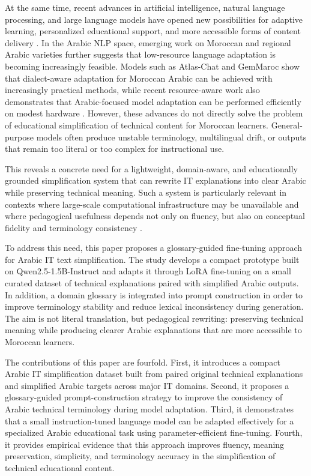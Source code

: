 \documentclass[education,article,submit,moreauthors]{Definitions/mdpi}
\begin{document}
At the same time, recent advances in artificial intelligence, natural language processing, and large language models have opened new possibilities for adaptive learning, personalized educational support, and more accessible forms of content delivery \citep{Alqahtani2023EmergentRoleAI,Gutierrez2023AILanguageEducation,RE2024RevolutionizingEducationAI,Ismaili2024AILiteracyAdaptiveLearning}. In the Arabic NLP space, emerging work on Moroccan and regional Arabic varieties further suggests that low-resource language adaptation is becoming increasingly feasible. Models such as Atlas-Chat and GemMaroc show that dialect-aware adaptation for Moroccan Arabic can be achieved with increasingly practical methods, while recent resource-aware work also demonstrates that Arabic-focused model adaptation can be performed efficiently on modest hardware \citep{Shang2024AtlasChat,Skiredj2025GemMaroc,Aryan2024ResourceAwareArabicLLM}. However, these advances do not directly solve the problem of educational simplification of technical content for Moroccan learners. General-purpose models often produce unstable terminology, multilingual drift, or outputs that remain too literal or too complex for instructional use.

This reveals a concrete need for a lightweight, domain-aware, and educationally grounded simplification system that can rewrite IT explanations into clear Arabic while preserving technical meaning. Such a system is particularly relevant in contexts where large-scale computational infrastructure may be unavailable and where pedagogical usefulness depends not only on fluency, but also on conceptual fidelity and terminology consistency \citep{Aryan2024ResourceAwareArabicLLM,Kolchenko2018AIReplaceTeachers,Talib2023MTechnologiesCareerGuidance}.

To address this need, this paper proposes a glossary-guided fine-tuning approach for Arabic IT text simplification. The study develops a compact prototype built on Qwen2.5-1.5B-Instruct \citep{Qwen2024TechnicalReport,Qwen2024ModelCard} and adapts it through LoRA fine-tuning on a small curated dataset of technical explanations paired with simplified Arabic outputs. In addition, a domain glossary is integrated into prompt construction in order to improve terminology stability and reduce lexical inconsistency during generation. The aim is not literal translation, but pedagogical rewriting: preserving technical meaning while producing clearer Arabic explanations that are more accessible to Moroccan learners.

The contributions of this paper are fourfold. First, it introduces a compact Arabic IT simplification dataset built from paired original technical explanations and simplified Arabic targets across major IT domains. Second, it proposes a glossary-guided prompt-construction strategy to improve the consistency of Arabic technical terminology during model adaptation. Third, it demonstrates that a small instruction-tuned language model can be adapted effectively for a specialized Arabic educational task using parameter-efficient fine-tuning. Fourth, it provides empirical evidence that this approach improves fluency, meaning preservation, simplicity, and terminology accuracy in the simplification of technical educational content.
\end{document}
